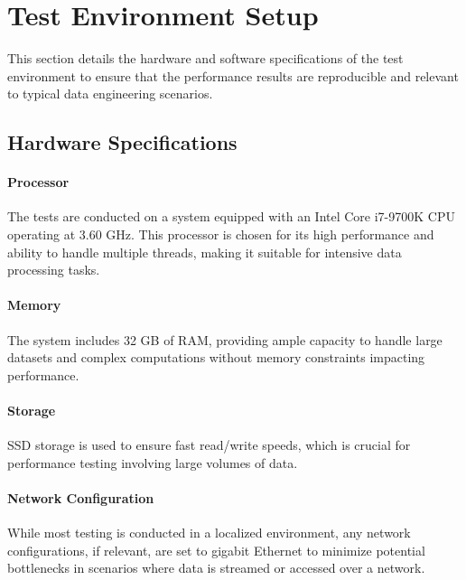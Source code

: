 \section{Test Environment Setup}


This section details the hardware and software specifications of the test environment to ensure that the performance results are reproducible and relevant to typical data engineering scenarios.

\subsection{Hardware Specifications}

    \paragraph{Processor} The tests are conducted on a system equipped with an Intel Core i7-9700K CPU operating at 3.60 GHz. This processor is chosen for its high performance and ability to handle multiple threads, making it suitable for intensive data processing tasks.
    \paragraph{Memory} The system includes 32 GB of RAM, providing ample capacity to handle large datasets and complex computations without memory constraints impacting performance.
    \paragraph{Storage} SSD storage is used to ensure fast read/write speeds, which is crucial for performance testing involving large volumes of data.
    \paragraph{Network Configuration} While most testing is conducted in a localized environment, any network configurations, if relevant, are set to gigabit Ethernet to minimize potential bottlenecks in scenarios where data is streamed or accessed over a network.

